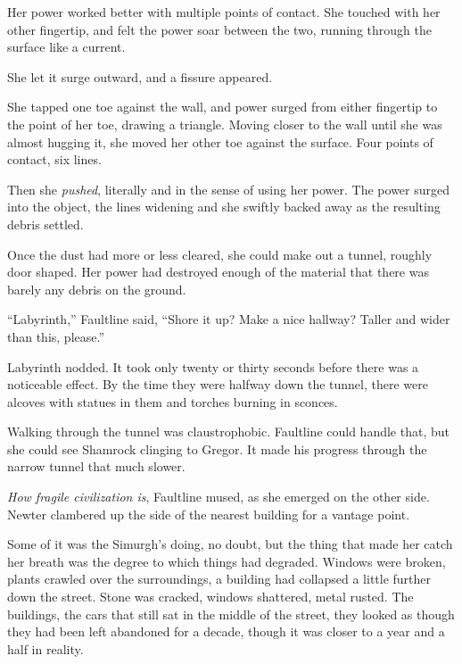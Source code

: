 Her power worked better with multiple points of contact.  She touched with her other fingertip, and felt the power soar between the two, running through the surface like a current.



She let it surge outward, and a fissure appeared.



She tapped one toe against the wall, and power surged from either fingertip to the point of her toe, drawing a triangle.  Moving closer to the wall until she was almost hugging it, she moved her other toe against the surface.  Four points of contact, six lines.



Then she \emph{pushed}, literally and in the sense of using her power.  The power surged into the object, the lines widening and she swiftly backed away as the resulting debris settled.



Once the dust had more or less cleared, she could make out a tunnel, roughly door shaped.  Her power had destroyed enough of the material that there was barely any debris on the ground.



``Labyrinth,'' Faultline said, ``Shore it up?  Make a nice hallway?  Taller and wider than this, please.''



Labyrinth nodded.  It took only twenty or thirty seconds before there was a noticeable effect.  By the time they were halfway down the tunnel, there were alcoves with statues in them and torches burning in sconces.



Walking through the tunnel was claustrophobic.  Faultline could handle that, but she could see Shamrock clinging to Gregor.  It made his progress through the narrow tunnel that much slower.



\emph{How fragile civilization is}, Faultline mused, as she emerged on the other side.  Newter clambered up the side of the nearest building for a vantage point.



Some of it was the Simurgh's doing, no doubt, but the thing that made her catch her breath was the degree to which things had degraded.  Windows were broken, plants crawled over the surroundings, a building had collapsed a little further down the street.  Stone was cracked, windows shattered, metal rusted.  The buildings, the cars that still sat in the middle of the street, they looked as though they had been left abandoned for a decade, though it was closer to a year and a half in reality.



